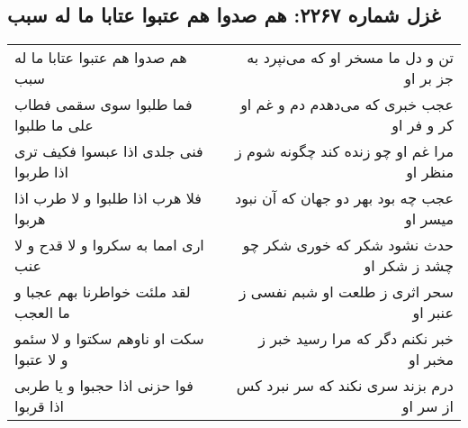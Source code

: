 \begin{center}
\section*{غزل شماره ۲۲۶۷: هم صدوا هم عتبوا عتابا ما له سبب}
\label{sec:2267}
\begin{longtable}{l p{0.5cm} r}
هم صدوا هم عتبوا عتابا ما له سبب
&&
تن و دل ما مسخر او که می‌نپرد به جز بر او
\\
فما طلبوا سوی سقمی فطاب علی ما طلبوا
&&
عجب خبری که می‌دهدم دم و غم او کر و فر او
\\
فنی جلدی اذا عبسوا فکیف تری اذا طربوا
&&
مرا غم او چو زنده کند چگونه شوم ز منظر او
\\
فلا هرب اذا طلبوا و لا طرب اذا هربوا
&&
عجب چه بود بهر دو جهان که آن نبود میسر او
\\
اری امما به سکروا و لا قدح و لا عنب
&&
حدث نشود شکر که خوری شکر چو چشد ز شکر او
\\
لقد ملئت خواطرنا بهم عجبا و ما العجب
&&
سحر اثری ز طلعت او شبم نفسی ز عنبر او
\\
سکت او ناوهم سکتوا و لا سئمو و لا عتبوا
&&
خبر نکنم دگر که مرا رسید خبر ز مخبر او
\\
فوا حزنی اذا حجبوا و یا طربی اذا قربوا
&&
درم بزند سری نکند که سر نبرد کس از سر او
\\
\end{longtable}
\end{center}
